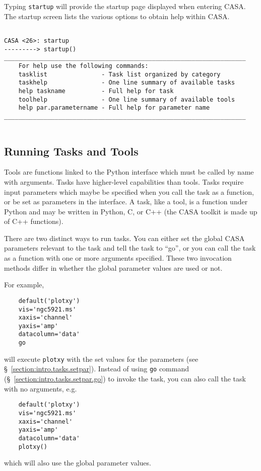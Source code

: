Typing {\tt startup} will provide the startup page displayed when
entering CASA. The startup screen lists the various options to obtain
help within CASA.
\small
\begin{verbatim}

CASA <26>: startup
---------> startup()
___________________________________________________________________
    For help use the following commands:
    tasklist               - Task list organized by category
    taskhelp               - One line summary of available tasks
    help taskname          - Full help for task
    toolhelp               - One line summary of available tools
    help par.parametername - Full help for parameter name
___________________________________________________________________


\end{verbatim}
\normalsize


\subsection{Running Tasks and Tools}
\label{section:intro.tasks.run}

Tools are functions linked to the Python interface which must be
called by name with arguments.  Tasks have higher-level capabilities
than tools.  Tasks require input parameters which maybe be specified
when you call the task as a function, or be set as parameters in the
interface.  A task, like a tool, is a function under Python and may be
written in Python, C, or C++ (the CASA toolkit is made up of C++
functions).

There are two distinct ways to run tasks. You can either set the
global CASA parameters relevant to the task and
tell the task to ``go'', or you can call the task as a function with
one or more arguments specified.  These two invocation methods differ
in whether the global parameter values are used or not.

For example,
\small
\begin{verbatim}
    default('plotxy')
    vis='ngc5921.ms'
    xaxis='channel'
    yaxis='amp'
    datacolumn='data'
    go
\end{verbatim}
\normalsize
will execute {\tt plotxy} with the set values for the parameters
(see \S~\ref{section:intro.tasks.setpar}).  Instead of using 
{\tt go} command (\S~\ref{section:intro.tasks.setpar.go}) to invoke
the task, you can also call the task with no arguments, e.g.
\small
\begin{verbatim}
    default('plotxy')
    vis='ngc5921.ms'
    xaxis='channel'
    yaxis='amp'
    datacolumn='data'
    plotxy()
\end{verbatim}
\normalsize
which will also use the global parameter values.

